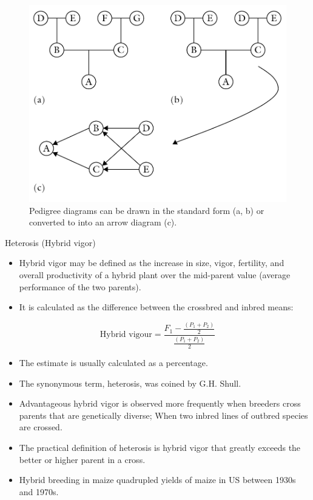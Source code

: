 \documentclass[11pt,dvipsnames,ignorenonframetext,aspectratio=169]{beamer}
\providecommand{\tightlist}{%
  \setlength{\itemsep}{0pt}\setlength{\parskip}{0pt}}
\begin{document}
\begin{frame}{}
\protect\hypertarget{section-4}{}
\begin{figure}

{\centering \includegraphics[width=0.45\linewidth]{../images/arrow_diagram} 

}

\caption{Pedigree diagrams can be drawn in the standard form (a, b) or converted to into an arrow diagram (c).}\label{fig:inbreeding-coefficient}
\end{figure}
\end{frame}

\begin{frame}{Heterosis (Hybrid vigor)}
\protect\hypertarget{heterosis-hybrid-vigor}{}
\begin{itemize}
\tightlist
\item
  Hybrid vigor may be defined as the increase in size, vigor, fertility,
  and overall productivity of a hybrid plant over the mid-parent value
  (average performance of the two parents).
\item
  It is calculated as the difference between the crossbred and inbred
  means:
\end{itemize}

\[\text{Hybrid vigour} = \frac{F_1-\frac{(P_1+P_2)}{2}}{\frac{(P_1+P_2)}{2}}\]

\begin{itemize}
\tightlist
\item
  The estimate is usually calculated as a percentage.
\item
  The synonymous term, heterosis, was coined by G.H. Shull.
\item
  Advantageous hybrid vigor is observed more frequently when breeders
  cross parents that are genetically diverse; When two inbred lines of
  outbred species are crossed.
\item
  The practical definition of heterosis is hybrid vigor that greatly
  exceeds the better or higher parent in a cross.
\item
  Hybrid breeding in maize quadrupled yields of maize in US between
  1930s and 1970s.
\end{itemize}
\end{frame}
\end{document}
